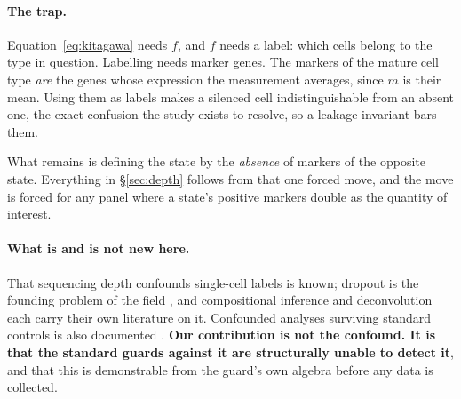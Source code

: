 \documentclass{article}
\begin{document}
\paragraph{The trap.} Equation~\ref{eq:kitagawa} needs $f$, and $f$ needs a
label: which cells belong to the type in question. Labelling needs marker genes.
The markers of the mature cell type \emph{are} the genes whose expression the
measurement averages, since $m$ is their mean. Using them as labels makes a
silenced cell indistinguishable from an absent one, the exact confusion the study
exists to resolve, so a leakage invariant bars them.

What remains is defining the state by the \emph{absence} of markers of the
opposite state. Everything in \S\ref{sec:depth} follows from that one forced
move, and the move is forced for any panel where a state's positive markers
double as the quantity of interest.

\paragraph{What is and is not new here.} That sequencing depth confounds
single-cell labels is known; dropout is the founding problem of the field
\citep{kharchenko2014}, and compositional inference
\citep{buttner2021sccoda,dann2022milo} and deconvolution
\citep{newman2019cibersortx} each carry their own literature on it. Confounded
analyses surviving standard controls is also documented
\citep{squair2021confronting}. \textbf{Our contribution is not the confound. It
is that the standard guards against it are structurally unable to detect it},
and that this is demonstrable from the guard's own algebra before any data is
collected.
\end{document}
